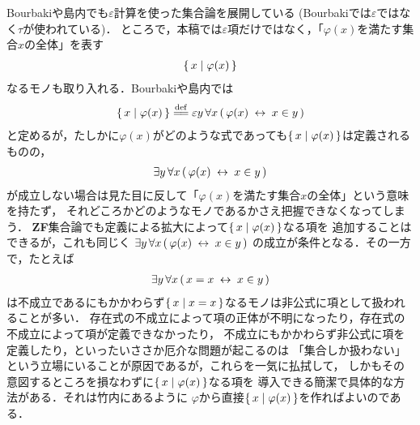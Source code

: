 	Bourbaki\cite{Bourbaki}や島内\cite{Shimauchi}でも$\varepsilon$計算を使った集合論を展開している
	(Bourbaki\cite{Bourbaki}では$\varepsilon$ではなく$\tau$が使われている)．
	ところで，本稿では$\varepsilon$項だけではなく，「$\varphi(x)$を満たす集合$x$の全体」を表す
	\begin{align}
		\{\, x \mid \varphi(x)\, \}
	\end{align}
	なるモノも取り入れる．Bourbaki\cite{Bourbaki}や島内\cite{Shimauchi}では
	\begin{align}
		\Set{x}{\varphi(x)} \defeq \varepsilon y\, \forall x\, 
		(\, \varphi(x) \lrarrow x \in y\, )
	\end{align}
	と定めるが，たしかに$\varphi(x)$がどのような式であっても$\{\, x \mid \varphi(x)\, \}$は定義されるものの，
	\begin{align}
		\exists y\, \forall x\, (\, \varphi(x) \hspace{0.25em}\leftrightarrow\hspace{0.25em} x \in y\, )
	\end{align}
	が成立しない場合は見た目に反して「$\varphi(x)$を満たす集合$x$の全体」という意味を持たず，
	それどころかどのようなモノであるかさえ把握できなくなってしまう．
	{\bf ZF}集合論でも定義による拡大によって$\{\, x \mid \varphi(x)\, \}$なる項を
	追加することはできるが，これも同じく
	$\exists y\, \forall x\, (\, \varphi(x) \hspace{0.25em}\leftrightarrow\hspace{0.25em} x \in y\, )$
	の成立が条件となる．その一方で，たとえば%
	\begin{align}
		\exists y\, \forall x\, (\, x = x \hspace{0.25em}\leftrightarrow\hspace{0.25em} x \in y\, )
	\end{align}
	は不成立であるにもかかわらず$\{\, x \mid x = x\, \}$なるモノは非公式に項として扱われることが多い．
	存在式の不成立によって項の正体が不明になったり，存在式の不成立によって項が定義できなかったり，
	不成立にもかかわらず非公式に項を定義したり，といったいささか厄介な問題が起こるのは
	「集合しか扱わない」という立場にいることが原因であるが，これらを一気に払拭して，
	しかもその意図するところを損なわずに$\{\, x \mid \varphi(x)\, \}$なる項を
	導入できる簡潔で具体的な方法がある．それは竹内\cite{TakeuchiSet}にあるように
	$\varphi$から直接$\{\, x \mid \varphi(x)\, \}$を作ればよいのである．
	
